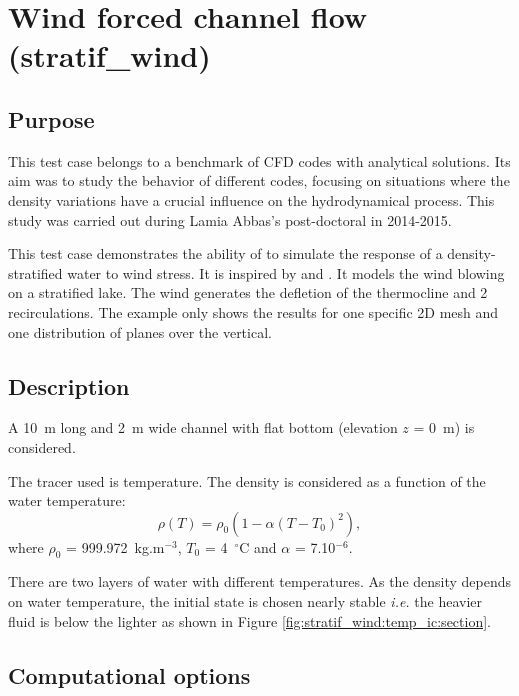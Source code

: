 \chapter{Wind forced channel flow (stratif\_wind)}
%
%
\section{Purpose}
%
This test case belongs to a benchmark of CFD codes with analytical solutions.
Its aim was to study the behavior of different codes, focusing on situations
where the density variations have a crucial influence on the hydrodynamical
process.
This study was carried out during Lamia Abbas's post-doctoral \cite{Abbas2015}
in 2014-2015.

This test case demonstrates the ability of  to simulate the response
of a density-stratified water to wind stress.
It is inspired by \cite{Audusse2011} and \cite{Pelanti}.
It models the wind blowing on a stratified lake.
The wind generates the defletion of the thermocline and 2 recirculations.
The example only shows the results for one specific 2D mesh and one distribution
of planes over the vertical.

%
\section{Description}
%
A 10~m long and 2~m wide channel with flat bottom (elevation $z$ = 0~m) is
considered.

The tracer used is temperature.
The density is considered as a function of the water temperature:
\begin{equation}
  \rho(T) = \rho_0 \left(1 - \alpha (T-T_0)^2\right),
\end{equation}
where $\rho_0$ = 999.972~kg.m$^{-3}$, $T_0$ = 4~$^{\circ}$C
and $\alpha$ = 7.10$^{-6}$.

There are two layers of water with different temperatures.
As the density depends on water temperature, the initial state
is chosen nearly stable \emph{i.e.} the heavier fluid is below the lighter
as shown in Figure \ref{fig:stratif_wind:temp_ic:section}.

%
\section{Computational options}
%
